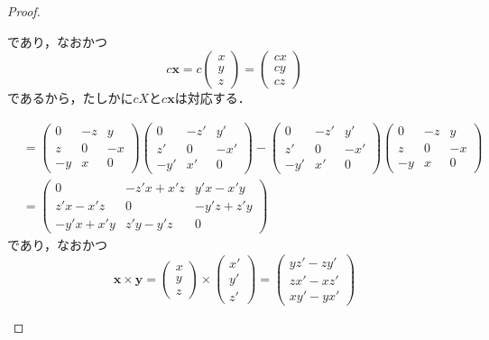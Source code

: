 \documentclass[a4paper,10pt,fleqn]{ltjsarticle}
\begin{document}
\begin{leftbar}
\begin{proof}
\begin{description}
\[                  \]
                  であり，なおかつ
                  \[
                      c\bm{x} = c\begin{pmatrix} x \\ y \\ z \end{pmatrix} = \begin{pmatrix} cx \\ cy \\ cz \end{pmatrix}
                  \]
                  であるから，たしかに$cX$と$c\bm{x}$は対応する．
            \item [【\text{$[X,Y]$と$\bm{x} \times \bm{y}$について】}]
                  \begin{align*}
                      [X,Y] & =\begin{pmatrix} 0 & -z & y \\ z & 0 & -x \\ -y & x & 0 \end{pmatrix}\begin{pmatrix} 0 & -z ' & y ' \\ z' & 0 & -x' \\ -y' & x ' & 0 \end{pmatrix}-\begin{pmatrix} 0 & -z ' & y ' \\ z' & 0 & -x' \\ -y' & x ' & 0 \end{pmatrix} \begin{pmatrix} 0 & -z & y \\ z & 0 & -x \\ -y & x & 0 \end{pmatrix} \\
                            & = \begin{pmatrix} 0 & -z'x+x'z & y'x-x'y \\ z'x-x'z & 0 & -y'z+z'y \\ -y'x+x'y & z'y-y'z & 0 \end{pmatrix}
                  \end{align*}
                  であり，なおかつ
                  \[
                      \bm{x}\times \bm{y} = \begin{pmatrix} x \\ y \\ z \end{pmatrix} \times \begin{pmatrix} x' \\ y ' \\ z' \end{pmatrix} = \begin{pmatrix} yz'-zy' \\ zx'-xz' \\ xy'-yx' \end{pmatrix}
\]
\end{description}
\end{proof}
\end{leftbar}
\end{document}
